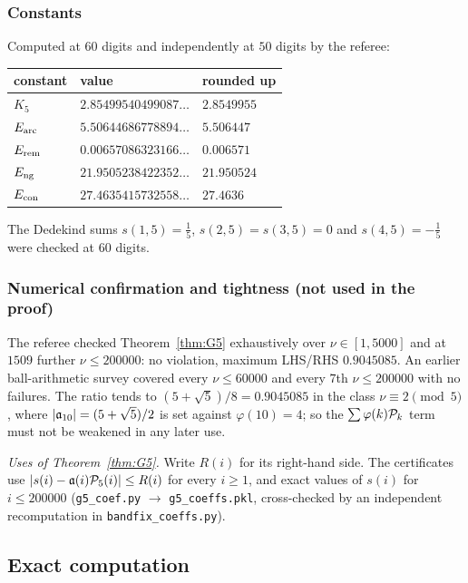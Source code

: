 \subsubsection{Constants}\label{sec:G5-constants}
Computed at $60$ digits and independently at $50$ digits by the referee:
\begin{center}
\small
\begin{tabular}{lll}
\toprule
constant & value & rounded up\\
\midrule
$K_5$ & $2.85499540499087\ldots$ & $2.8549955$\\
$E_{\rm arc}$ & $5.50644686778894\ldots$ & $5.506447$\\
$E_{\rm rem}$ & $0.00657086323166\ldots$ & $0.006571$\\
$E_{\rm ng}$ & $21.9505238422352\ldots$ & $21.950524$\\
$E_{\mathrm{con}}$ & $27.4635415732558\ldots$ & $27.4636$\\
\bottomrule
\end{tabular}
\end{center}
The Dedekind sums $s(1,5)=\tfrac15$, $s(2,5)=s(3,5)=0$ and $s(4,5)=-\tfrac15$ were checked at $60$ digits.

\subsubsection{Numerical confirmation and tightness (not used in the proof)}
The referee checked Theorem~\ref{thm:G5} exhaustively over $\nu\in[1,5000]$ and at $1509$ further $\nu\le200000$: no
violation, maximum LHS/RHS $0.9045085$. An earlier ball-arithmetic survey covered every $\nu\le60000$ and every $7$th
$\nu\le200000$ with no failures. The ratio tends to $(5+\sqrt5)/8=0.9045085$ in the class $\nu\equiv2\pmod 5$, where
$|\mathfrak a_{10}|=(5+\sqrt5)/2$ is set against $\varphi(10)=4$; so the $\sum\varphi(k)\mathcal P_k$ term must not be weakened in any
later use.

\emph{Uses of Theorem~\ref{thm:G5}.} Write $R(i)$ for its right-hand side. The certificates use
$|s(i)-\mathfrak a(i)\mathcal P_5(i)|\le R(i)$ for every $i\ge1$, and exact values of $s(i)$ for $i\le200000$ (\texttt{g5\_coef.py}
$\to$ \texttt{g5\_coeffs.pkl}, cross-checked by an independent recomputation in \texttt{bandfix\_coeffs.py}).

\subsection{Exact computation}\label{sec:t-exact}

